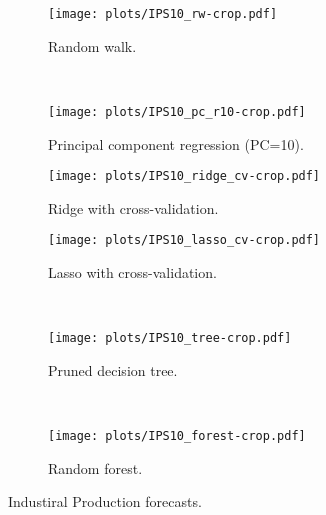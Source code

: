 \documentclass[a4paper,11pt]{scrartcl}
\begin{document}
\begin{figure}
    \centering
    \begin{subfigure}[b]{0.48\textwidth}
        \texttt{[image: plots/IPS10\_rw-crop.pdf]}
        \caption{Random walk.}
        \label{fig:IPS10_rw}
    \end{subfigure} ~
    \vspace{0.7cm}
    \begin{subfigure}[b]{0.48\textwidth}
        \texttt{[image: plots/IPS10\_pc\_r10-crop.pdf]}
        \caption{Principal component regression (PC=10).}
        \label{fig:IPS10_pc}
    \end{subfigure}
    \vspace{0.7cm}
    \begin{subfigure}[b]{0.48\textwidth}
        \texttt{[image: plots/IPS10\_ridge\_cv-crop.pdf]}
        \caption{Ridge with cross-validation.}
        \label{fig:IPS10_ridge}
    \end{subfigure}
    \begin{subfigure}[b]{0.48\textwidth}
        \texttt{[image: plots/IPS10\_lasso\_cv-crop.pdf]}
        \caption{Lasso with cross-validation.}
        \label{fig:IPS10_lasso}
    \end{subfigure} ~
    \begin{subfigure}[b]{0.48\textwidth}
        \texttt{[image: plots/IPS10\_tree-crop.pdf]}
        \caption{Pruned decision tree.}
        \label{fig:IPS10_tree}
    \end{subfigure} ~
    \begin{subfigure}[b]{0.48\textwidth}
        \texttt{[image: plots/IPS10\_forest-crop.pdf]}
        \caption{Random forest.}
        \label{fig:IPS10_forest}
    \end{subfigure}
    \caption{Industiral Production forecasts.}
    \label{fig:IPS10}
\end{figure}
\end{document}
